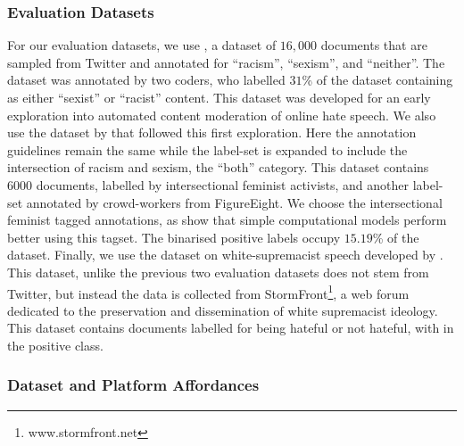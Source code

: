 \subsubsection{Evaluation Datasets}
For our evaluation datasets, we use \citet{Waseem-Hovy:2016}, a dataset of $16,000$ documents that are sampled from Twitter and annotated for ``racism'', ``sexism'', and ``neither''. The dataset was annotated by two coders, who labelled $31$\% of the dataset containing as either ``sexist'' or ``racist'' content. This dataset was developed for an early exploration into automated content moderation of online hate speech. We also use the dataset by \citet{Waseem:2016} that followed this first exploration. Here the annotation guidelines remain the same while the label-set is expanded to include the intersection of racism and sexism, the ``both'' category. This dataset contains $6000$ documents, labelled by intersectional feminist activists, and another label-set annotated by crowd-workers from FigureEight. We choose the intersectional feminist tagged annotations, as \citet{Waseem:2016} show that simple computational models perform better using this tagset. The binarised positive labels occupy $15.19$\% of the dataset. Finally, we use the dataset on white-supremacist speech developed by \citet{Garcia:2019}. This dataset, unlike the previous two evaluation datasets does not stem from Twitter, but instead the data is collected from StormFront\footnote{www.stormfront.net}, a web forum dedicated to the preservation and dissemination of white supremacist ideology. This dataset contains  documents labelled for being hateful or not hateful, with  in the positive class.

\subsubsection{Dataset and Platform Affordances}

